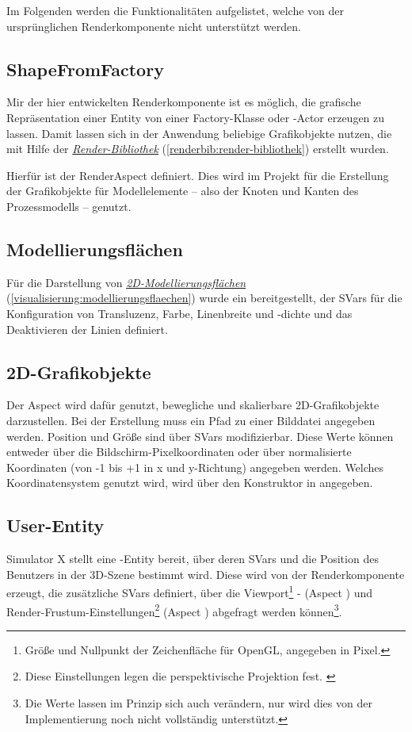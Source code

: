 \documentclass[a4paper,10pt]{sphinxmanual}
\begin{document}
Im Folgenden werden die Funktionalitäten aufgelistet, welche von der ursprünglichen Renderkomponente nicht unterstützt werden.


\subsection{ShapeFromFactory}
\label{renderkomponente:shapefromfactory}
Mir der hier entwickelten Renderkomponente ist es möglich, die grafische Repräsentation einer Entity von einer Factory-Klasse oder -Actor erzeugen zu lassen.
Damit lassen sich in der Anwendung beliebige Grafikobjekte nutzen, die mit Hilfe der {\hyperref[renderbib:render-bibliothek]{\emph{Render-Bibliothek}}} (\autoref*{renderbib:render-bibliothek}) erstellt wurden.

Hierfür ist der RenderAspect  definiert.
Dies wird im Projekt für die Erstellung der Grafikobjekte für Modellelemente – also der Knoten und Kanten des Prozessmodells – genutzt.


\subsection{Modellierungsflächen}
\label{renderkomponente:modellierungsflachen}
Für die Darstellung von {\hyperref[visualisierung:modellierungsflaechen]{\emph{2D-Modellierungsflächen}}} (\autoref*{visualisierung:modellierungsflaechen}) wurde ein  bereitgestellt, der SVars für die Konfiguration von Transluzenz, Farbe, Linenbreite und -dichte und das Deaktivieren der Linien definiert.


\subsection{2D-Grafikobjekte}
\label{renderkomponente:d-grafikobjekte}
Der Aspect  wird dafür genutzt, bewegliche und skalierbare 2D-Grafikobjekte darzustellen.
Bei der Erstellung muss ein Pfad zu einer Bilddatei angegeben werden. Position und Größe sind über SVars modifizierbar.
Diese Werte können entweder über die Bildschirm-Pixelkoordinaten oder über normalisierte Koordinaten (von -1 bis +1 in x und y-Richtung) angegeben werden.
Welches Koordinatensystem genutzt wird, wird über den Konstruktor in  angegeben.


\subsection{User-Entity}
\label{renderkomponente:user-entity}
Simulator X stellt eine -Entity bereit, über deren SVars  und  die Position des Benutzers in der 3D-Szene bestimmt wird.
Diese wird von der Renderkomponente erzeugt, die zusätzliche SVars definiert, über die Viewport\footnote{
Größe und Nullpunkt der Zeichenfläche für OpenGL, angegeben in Pixel.
} - (Aspect ) und Render-Frustum-Einstellungen\footnote{
Diese Einstellungen legen die perspektivische Projektion fest. \cite{www:frustum}
} (Aspect ) abgefragt werden können\footnote{
Die Werte lassen im Prinzip sich auch verändern, nur wird dies von der Implementierung noch nicht vollständig unterstützt.
}.
\end{document}
